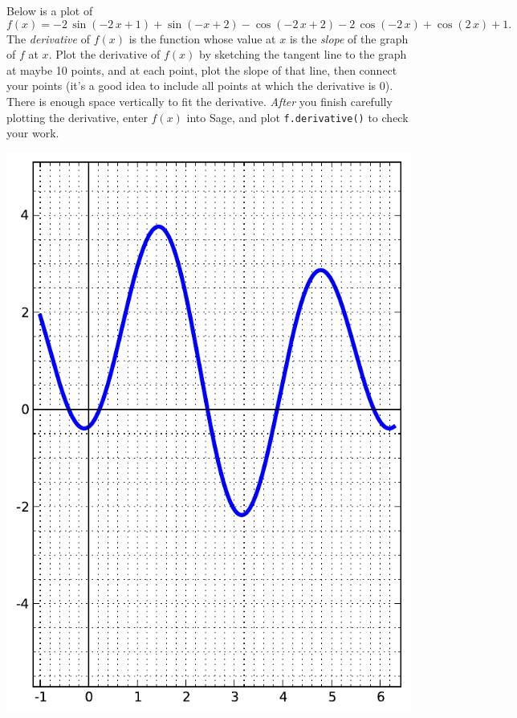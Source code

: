 Below is a plot of $$f(x)=-2 \, \sin\left(-2 \, x + 1\right) + \sin\left(-x + 2\right) - \cos\left(-2 \, x + 2\right) - 2 \, \cos\left(-2 \, x\right) + \cos\left(2 \, x\right) + 1.$$  The {\em \color{red}derivative} of $f(x)$ is the function whose value at $x$ is the {\em slope} of the graph of $f$ at $x$.  Plot the derivative of $f(x)$ by sketching the tangent line to the graph at maybe 10 points, and at each point, plot the slope of that line, then connect your points (it's a good idea to include all points at which the derivative is 0).  There is enough space vertically to fit the derivative.  {\em After} you finish carefully plotting the derivative, enter $f(x)$ into Sage, and plot {\color{blue}\verb|f.derivative()|} to check your work.
\begin{center}\includegraphics{functions/66.pdf}\end{center}\newpage

